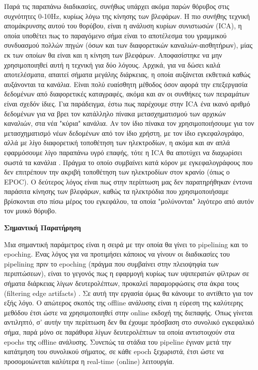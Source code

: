 \documentclass[11pt,a4paper,english,greek,twoside]{../Thesis}
\begin{document}
\par Παρά τις παραπάνω διαδικασίες, συνήθως υπάρχει ακόμα παρών θόρυβος στις συχνότητες 0-10Hz, κυρίως λόγω της κίνησης των βλεφάρων. Η πιο συνήθης τεχνική απομάκρυνσης αυτού του θορύβου, είναι η ανάλυση κυρίων συνιστωσών (ICA), η οποία υποθέτει πως το παραγόμενο σήμα είναι το αποτέλεσμα του γραμμικού συνδυασμού πολλών πηγών (όσων και των διαφορετικών καναλιών-αισθητήρων), μίας εκ των οποίων θα είναι και η κίνηση των βλεφάρων. Αποφασίστηκε να μην χρησιμοποιηθεί αυτή η τεχνική για δύο λόγους. Αρχικά, για να δώσει καλά αποτελέσματα, απαιτεί σήματα μεγάλης διάρκειας, η οποία αυξάνεται εκθετικά καθώς αυξάνονται τα κανάλια. Είναι πολύ ευαίσθητη μέθοδος όσον αφορά την επεξεργασία δεδομένων από διαφορετικές καταγραφές, ακόμα και αν οι συνθήκες των πειραμάτων είναι σχεδόν ίδιες. Για παράδειγμα, έστω πως παρέχουμε στην ICA ένα ικανό αριθμό δεδομένων για να βρει τον κατάλληλο πίνακα μετασχηματισμού των αρχικών καναλιών, στα νέα "κύρια" κανάλια. Αν τον ίδιο πίνακα τον χρησιμοποιήσουμε για τον μετασχηματισμό νέων δεδομένων από τον ίδιο χρήστη, με τον ίδιο εγκεφαλογράφο, αλλά με λίγο διαφορετική τοποθέτηση των ηλεκτροδίων, η ακόμα και αν απλά εφαρμόσουμε λίγο παραπάνω υγρό επαφής, τότε η ICA θα αποτύχει να διαχωρίσει σωστά τα κανάλια \cite{noauthor_undated-vj}. Πράγμα το οποίο συμβαίνει κατά κόρον με εγκεφαλογράφους που δεν επιτρέπουν την ακριβή τοποθέτηση των ηλεκτροδίων στον κρανίο (όπως ο EPOC). Ο δεύτερος λόγος είναι πως στην περίπτωση μας δεν παρατηρήθηκαν έντονα παράσιτα κίνησης των βλεφάρων, καθώς τα ηλεκτρόδια που χρησιμοποιήσαμε βρίσκονται στο πίσω μέρος του εγκεφάλου, τα οποία "μολύνονται" λιγότερο από αυτόν τον μυικό θόρυβο.

\textbf{Σημαντική Παρατήρηση}
\par Μια σημαντική παράμετρος είναι η σειρά με την οποία θα γίνει το pipelining και το epoching. Ένας λόγος για να προτιμήσει κάποιος να γίνουν οι διαδικασίες του pipelining πριν το epoching (πράγμα που συμβαίνει στην πλειοψηφία των περιπτώσεων), είναι το γεγονός πως η εφαρμογή κυρίως των υψιπερατών φίλτρων σε σήματα διάρκειας λίγων δευτερολέπτων, προκαλεί παραμορφώσεις στα άκρα τους (filtering edge artifacts) \cite{noauthor_undated-rl}\cite{Luck2014-mg}. Σε αυτή την εργασία όμως θα κάνουμε το αντίθετο για τον εξής λόγο. Ο απώτερος σκοπός της offline ανάλυσης είναι η εύρεση της καλύτερης μεθόδου έτσι ώστε να χρησιμοποιηθεί στην online εκδοχή της διεπαφής. Όπως γίνεται αντιληπτό, σ' αυτήν την περίπτωση δεν θα έχουμε πρόσβαση στο συνολικό εγκεφαλικό σήμα, παρά μόνο σε παράθυρα λίγων δευτερολέπτων τα οποία αντιστοιχούν στα epochs της offline ανάλυσης. Συνεπώς τα στάδια του pipeline έγιναν μετά την κατάτμηση του συνολικού σήματος, σε κάθε epoch ξεχωριστά, έτσι ώστε να προσομοιώνεται καλύτερα η real-time (online) λειτουργία.
\end{document}
